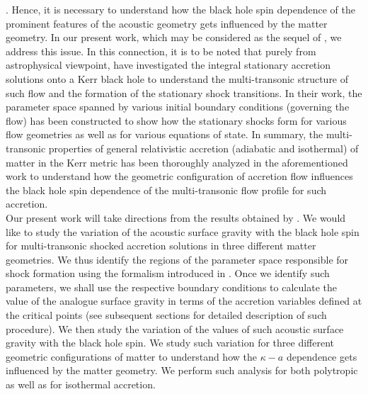 \documentclass[10pt,authoryear]{article}
\begin{document}
\cite{mrfng09apj,dwrb10mnras,kmtnm10mnras,tnm10apj,ziolkowski10,bggnps11a,daly11mnras,mr11mnras,mndgkoprs11cqg,nckp11mnras,
rbltmrnf12aip,tm12mnras,brenneman13,dcppv13apj,mtb13s,fpwmkrd14mnras,hlz14arxiv,jbs14arxiv,nt14arxiv,sbdr14arxiv}. 
Hence, it is necessary to understand how the black hole spin dependence of the prominent features of the acoustic geometry 
gets influenced by the matter geometry. In our present work, which may be considered as the sequel of 
\cite{td15ijmpd}, 
we address this issue. In this connection, it is to be noted that purely from astrophysical viewpoint, 
\cite{tbnd17na} 
have investigated the integral stationary accretion solutions onto a Kerr black hole to understand the multi-transonic 
structure of such flow and the formation of the stationary shock transitions. In their work, the parameter space spanned 
by various initial boundary conditions (governing the flow) has been constructed to show how the stationary shocks 
form for various flow geometries as well as for various equations of state. In summary, the multi-transonic properties of 
general relativistic accretion (adiabatic and isothermal) of matter in the Kerr metric has been thoroughly analyzed in the 
aforementioned work to understand how the geometric configuration of accretion flow influences the black hole spin dependence 
of the multi-transonic flow profile for such accretion. \\
Our present work will take directions from the results obtained by 
\cite{tbnd17na}. 
We would like to study the variation of the acoustic surface gravity with the black hole spin for multi-transonic shocked 
accretion solutions in three different matter geometries. We thus identify the regions of the parameter space responsible for 
shock formation using the formalism introduced in 
\cite{tbnd17na}. 
Once we identify such parameters, we shall use the respective boundary conditions to calculate the value of the analogue 
surface gravity in terms of the accretion variables defined at the critical points (see subsequent sections for detailed description 
of such procedure). We then study the variation of the values of such acoustic surface gravity with the black hole spin. We study 
such variation for three different geometric configurations of matter to understand how the $\kappa - a$ dependence gets influenced 
by the matter geometry. We perform such analysis for both polytropic as well as for isothermal accretion.  
\end{document}
